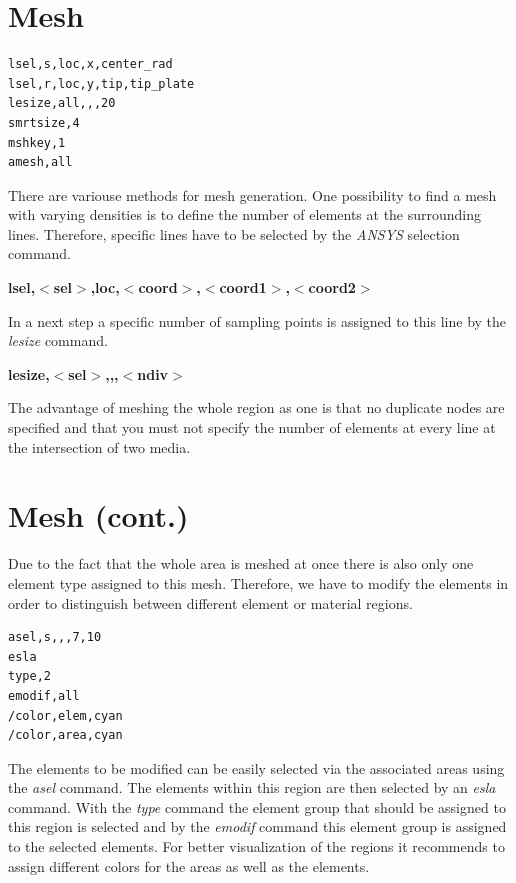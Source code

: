 \section*{Mesh}
%
\begin{verbatim}
lsel,s,loc,x,center_rad
lsel,r,loc,y,tip,tip_plate
lesize,all,,,20 
smrtsize,4
mshkey,1      
amesh,all            
\end{verbatim}
\begin{print}
There are variouse methods for mesh generation. One possibility to find a mesh with varying densities is to define the number of elements at the surrounding lines. Therefore, specific lines have to be selected by the {\em ANSYS} selection command.\\
\end{print}
{\bf lsel,$<$sel$>$,loc,$<$coord$>$,$<$coord1$>$,$<$coord2$>$}\\
%
\begin{print}
In a next step a specific number of sampling points is assigned to this line by the {\em lesize} command.\\
\end{print}
{\bf lesize,$<$sel$>$,,,$<$ndiv$>$}\\
\begin{print}
The advantage of meshing the whole region as one is that no duplicate nodes are specified and that you must not specify the number of elements at every line at the intersection of two media.
\end{print}
%
\begin{figure}[htb]
\begin{center}
\end{center}
\end{figure}
%
\newslide
%
\section*{Mesh (cont.)}
%
\begin{print}
Due to the fact that the whole area is meshed at once there is also only one element type assigned to this mesh. Therefore, we have to modify the elements in order to distinguish between different element or material regions.
\end{print}
\begin{verbatim}
asel,s,,,7,10
esla
type,2
emodif,all
/color,elem,cyan
/color,area,cyan           
\end{verbatim}
%
\begin{print}
The elements to be modified can be easily selected via the associated areas using the {\em asel} command. The elements within this region are then selected by an {\em esla} command. With the {\em type} command the element group that should be assigned to this region is selected and by the {\em emodif} command this element group is assigned to the selected elements. For better visualization of the regions it recommends to assign different colors for the areas as well as the elements.
\end{print}
